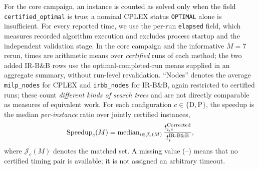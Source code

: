 \documentclass[11pt,a4paper]{article}
\begin{document}
For the core campaign, an instance is counted as solved only when the field \texttt{certified\_optimal} is true; a nominal CPLEX status \texttt{OPTIMAL} alone is insufficient. For every reported time, we use the per-run \texttt{elapsed} field, which measures recorded algorithm execution and excludes process startup and the independent validation stage. In the core campaign and the informative $M=7$ rerun, times are arithmetic means over \emph{certified} runs of each method; the two added IR-B\&B rows use the optimal-completed-run means supplied in an aggregate summary, without run-level revalidation. ``Nodes'' denotes the average \texttt{milp\_nodes} for CPLEX and \texttt{irbb\_nodes} for IR-B\&B, again restricted to certified runs; these count \emph{different kinds of search trees} and are not directly comparable as measures of equivalent work. For each configuration $c\in\{\mathrm D,\mathrm P\}$, the speedup is the median \emph{per-instance} ratio over jointly certified instances,
\begin{equation}\label{eq:speedup}
 \operatorname{Speedup}_c(M)
 =\operatorname{median}_{i\in\mathcal J_c(M)}
 \frac{t^{\rm Corrected}_{i,c}}{t^{\rm IR\text{-}B\&B}_{i}},
\end{equation}
where $\mathcal J_c(M)$ denotes the matched set. A missing value (--) means that no certified timing pair is available; it is not assigned an arbitrary timeout.
\end{document}
